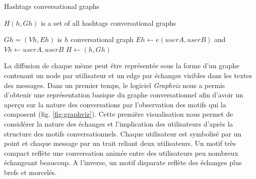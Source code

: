 \begin{algorithm}[htbp]
    \caption{Hashtags conversational graphs}
    \label{algo:hashtags-graph}
    \begin{algorithmic}
        \State $H(h,Gh)$ is a set of all hashtags conversational graphs


                    \State $Gh=(Vh,Eh)$ is $h$ conversational graph
                        \State $Eh \gets e(userA,userB)$ and $Vh \gets userA,userB $
                    \EndIf
                    \State $H \gets (h,Gh)$ 
                \EndIf
            \EndFor
        \EndFunction
    \end{algorithmic}
\end{algorithm}

La diffusion de chaque mème peut être représentée sous la forme d{\textquoteright}un graphe contenant un node par utilisateur et un edge par échanges visibles dans les textes des messages. Dans un premier temps, le logiciel \textit{Graphviz} nous a permis d{\textquoteright}obtenir une représentation basique du graphe conversationnel afin d{\textquoteright}avoir un aper\c{c}u sur la nature des conversations par l{\textquoteright}observation des motifs qui la composent (fig. \ref{fig:graphviz}). Cette première visualisation nous permet de considérer la nature des échanges et l{\textquoteright}implication des utilisateurs d{\textquoteright}après la structure des motifs conversationnels. Chaque utilisateur est symbolisé par un point et chaque message par un trait reliant deux utilisateurs. Un motif très compact reflète une conversation animée entre des utilisateurs peu nombreux échangeant beaucoup. A l{\textquoteright}inverse, un motif disparate reflète des échanges plus brefs et morcelés.

